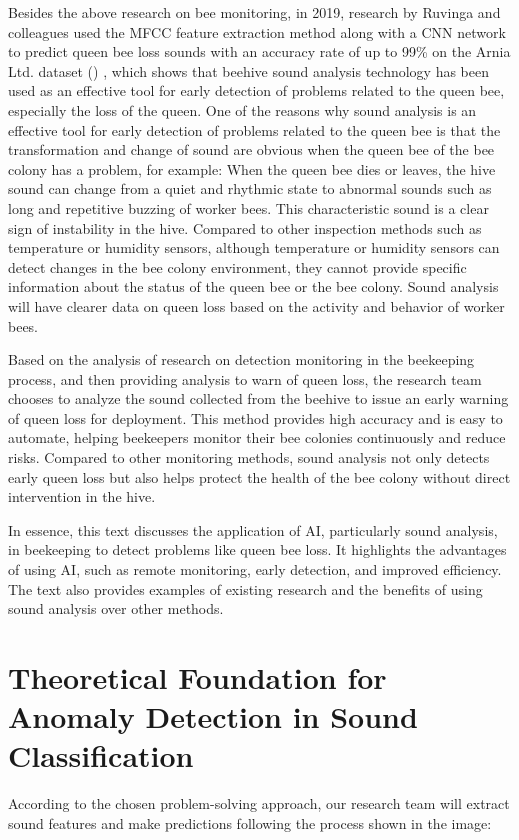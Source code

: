 \documentclass[twocolumn]{article}
\begin{document}
Besides the above research on bee monitoring, in 2019, research by Ruvinga and colleagues
used the MFCC feature extraction method along with a CNN network to predict queen bee loss
sounds with an accuracy rate of up to 99\% on the Arnia Ltd. dataset
() \cite{ruvinga2023identifying},
which shows that beehive sound analysis technology has been used as an effective tool for
early detection of problems related to the queen bee, especially the loss of the queen. One
of the reasons why sound analysis is an effective tool for early detection of problems
related to the queen bee is that the transformation and change of sound are obvious when
the queen bee of the bee colony has a problem, for example: When the queen bee dies or
leaves, the hive sound can change from a quiet and rhythmic state to abnormal sounds such
as long and repetitive buzzing of worker bees. This characteristic sound is a clear sign of
instability in the hive. Compared to other inspection methods such as temperature or
humidity sensors, although temperature or humidity sensors can detect changes in the bee
colony environment, they cannot provide specific information about the status of the queen
bee or the bee colony. Sound analysis will have clearer data on queen loss based on the
activity and behavior of worker bees.

Based on the analysis of research on detection monitoring in the beekeeping process,
and then providing analysis to warn of queen loss, the research team chooses to
analyze the sound collected from the beehive to issue an early warning of queen loss for
deployment. This method provides high accuracy and is easy to automate, helping beekeepers
monitor their bee colonies continuously and reduce risks. Compared to other monitoring
methods, sound analysis not only detects early queen loss but also helps protect the health
of the bee colony without direct intervention in the hive.

In essence, this text discusses the application of AI, particularly sound analysis, in
beekeeping to detect problems like queen bee loss. It highlights the advantages of using
AI, such as remote monitoring, early detection, and improved efficiency. The text also
provides examples of existing research and the benefits of using sound analysis over other
methods.

\section{Theoretical Foundation for Anomaly Detection in Sound Classification}
According to the chosen problem-solving approach, our research team will extract sound
features and make predictions following the process shown in the image:
\end{document}
